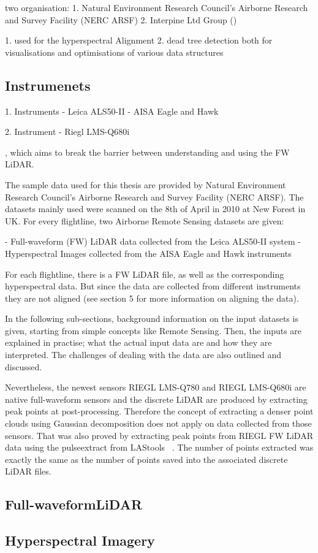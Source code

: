 \documentclass{subfiles}
\begin{document}
two organisation:
	1. Natural Environment Research Council’s Airborne Research and Survey Facility (NERC ARSF)
	2. Interpine Ltd Group () 
	
	1. used for the hyperspectral Alignment
	2. dead tree detection
	both for visualisations and optimisations of various data structures
	
	\subsection{Instrumenets}
	1. Instruments 
		- Leica ALS50-II
		- AISA Eagle and Hawk
		
	2. Instrument
		- Riegl LMS-Q680i
	
	\par 
	, which aims to break the barrier between understanding and using the FW LiDAR.
	

	The sample data used for this thesis are provided by Natural Environment Research Council’s Airborne Research and Survey Facility (NERC ARSF). The datasets mainly used were scanned on the 8th of April in 2010 at New Forest in UK. For every flightline, two Airborne Remote Sensing datasets are given: 
	
	-	Full-waveform (FW) LiDAR data collected from the Leica ALS50-II system
	-	Hyperspectral Images collected from the AISA Eagle and Hawk instruments
	
	For each flightline, there is a FW LiDAR file, as well as the corresponding hyperspectral data. But since the data are collected from different instruments they are not aligned (see section 5 for more information on aligning the data). 
	
	In the following sub-sections, background information on the input datasets is given, starting from simple concepts like Remote Sensing. Then, the inputs are explained in practise; what the actual input data are and how they are interpreted. The challenges of dealing with the data are also outlined and discussed. 


	\par Nevertheless, the newest sensors RIEGL LMS-Q780 and RIEGL LMS-Q680i are native full-waveform sensors and the discrete LiDAR are produced by extracting peak points at post-processing. Therefore the concept of extracting a denser point clouds using Gaussian decomposition does not apply on data collected from those sensors. That was also proved by extracting peak points from RIEGL FW LiDAR data using the pulseextract from LAStools ~\cite{LAStools}. The number of points extracted was exactly the same as the number of points saved into the associated discrete LiDAR files.


	\subsection{Full-waveformLiDAR}
	


	
	\subsection{Hyperspectral Imagery}
	
	
\end{document}
